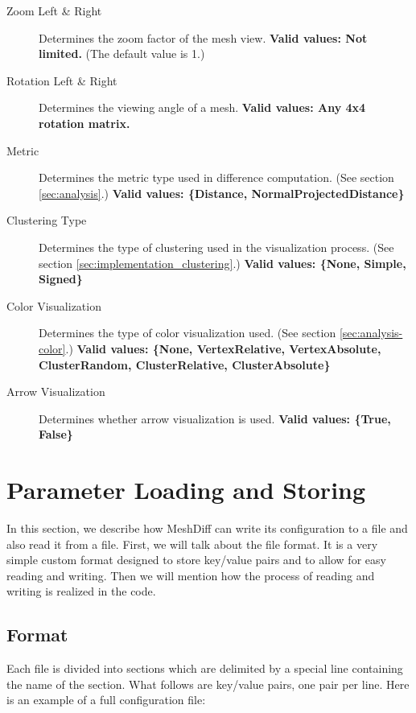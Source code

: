 \begin{description}
\item [Zoom Left \& Right] Determines the zoom factor of the mesh view. {\bf Valid values: Not limited.} (The default value is 1.)
\item [Rotation Left \& Right] Determines the viewing angle of a mesh. {\bf Valid values: Any 4x4 rotation matrix.}
\item [Metric] Determines the metric type used in difference computation. (See section \ref{sec:analysis}.) {\bf Valid values: \{Distance, NormalProjectedDistance\}}
\item [Clustering Type] Determines the type of clustering used in the visualization process. (See section \ref{sec:implementation_clustering}.) {\bf Valid values: \{None, Simple, Signed\}}
\item [Color Visualization] Determines the type of color visualization used. (See section \ref{sec:analysis-color}.) {\bf Valid values: \{None, VertexRelative, VertexAbsolute, ClusterRandom, ClusterRelative, ClusterAbsolute\}}
\item [Arrow Visualization] Determines whether arrow visualization is used. {\bf Valid values: \{True, False\}}
\end{description}

\section{Parameter Loading and Storing}
\label{sec:parameter_load_store}

In this section, we describe how MeshDiff can write its configuration to a file and also read it from a file. First, we will talk about the file format. It is a very simple custom format designed to store key/value pairs and to allow for easy reading and writing. Then we will mention how the process of reading and writing is realized in the code.

\subsection{Format}

Each file is divided into sections which are delimited by a special line containing the name of the section. What follows are key/value pairs, one pair per line. Here is an example of a full configuration file:

